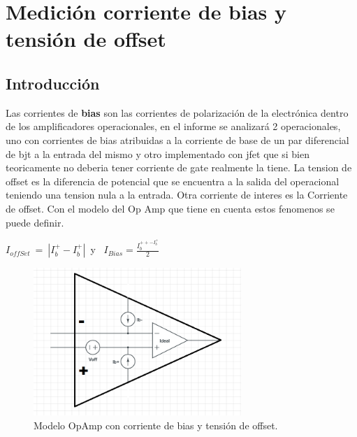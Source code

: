 






\section{Medici\'on corriente de bias y tensi\'on de offset}

\subsection{Introducción}
Las corrientes de \textbf{bias} son las corrientes de polarización de la electrónica dentro de los amplificadores operacionales, en el informe se analizará 2 operacionales, uno con corrientes de bias atribuidas a la corriente de base de un par diferencial de bjt a la entrada del mismo y otro implementado con jfet que si bien teoricamente no deberia tener corriente de gate realmente la tiene.
La tension de offset es la diferencia de potencial que se encuentra a la salida del operacional teniendo una tension nula a la entrada.
Otra corriente de interes es la Corriente de offset.
Con el modelo del Op Amp que tiene en cuenta estos fenomenos se puede definir.\newline
 	
 $I_{offSet} \ = \ |I_b^{+}-I_b^{+}|$\ y \ $I_{Bias}= \frac{I_b^{++-I_b^{+}}}{2}$
\begin{figure}[htb]	
	\centering
	\includegraphics[width=0.7\textwidth]{Ejercicio3/imagenes/opampReal.PNG}
	\caption{Modelo OpAmp con corriente de bias y tensión de offset.}
	\label{fig:OpampBias}
\end{figure}



